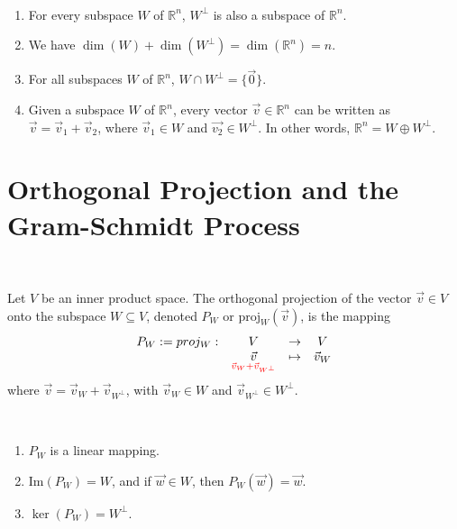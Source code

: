 \documentclass[11pt,fleqn]{book} %
\begin{document}
\setcounter{chapter}{4}
\setcounter{section}{4}
\setcounter{dummy}{2}
\begin{proposition}
{~~~}

    \begin{enumerate}[label=\alph*)]
        \item For every subspace $W$ of $\mathbb{R}^n$, $W^\perp$ is also a subspace of $\mathbb{R}^n$.
        \item We have $\dim(W) + \dim(W^\perp) = \dim(\mathbb{R}^n) = n$.
        \item For all subspaces $W$ of $\mathbb{R}^n$, $W \cap W^\perp = \{ \vec{0} \}$.
        \item Given a subspace $W$ of $\mathbb{R}^n$, every vector $\vec{v} \in \mathbb{R}^n$ can be written  as $\vec{v} = \vec{v}_1 + \vec{v}_2$, where $\vec{v}_1 \in W$ and $\vec{v_2} \in W^\perp$. In other words, $\mathbb{R}^n = W \oplus W^\perp$.
    \end{enumerate}
\end{proposition}
\setcounter{section}{3}
\setcounter{chapter}{3}

\section{Orthogonal Projection and the Gram-Schmidt Process}

\setcounter{section}{0}
\setcounter{definitionT}{4}
\begin{definition}
{~~~}

    Let $V$ be an inner product space. The orthogonal projection of the vector $\vec{v} \in V$ onto the subspace $W \subseteq V$, denoted $P_W$ or $\mathrm{proj}_W(\vec{v})$, is the mapping
    $$\begin{matrix}P_W := proj_W: &V &\to &V \\ &\underset{\color{red}\vec{v}_W + \vec{v}_{W^\perp}}{\vec{v}} &\mapsto &\vec{v}_W\end{matrix}$$
    where $\vec{v} = \vec{v}_W + \vec{v}_{W^\perp}$, with $\vec{v}_W \in W$ and $\vec{v}_{W^\perp} \in W^\perp$.
\end{definition}
\setcounter{section}{4}

\setcounter{chapter}{4}
\setcounter{dummy}{4}
\begin{proposition}
{~~~}

    \begin{enumerate}[label=\alph*)]
        \item $P_W$ is a linear mapping.
        \item $\mathrm{Im}(P_W) = W$, and if $\vec{w} \in W$, then $P_W(\vec{w}) = \vec{w}$.
        \item $\ker(P_W) = W^\perp$.
    \end{enumerate}
\end{proposition}
\end{document}
